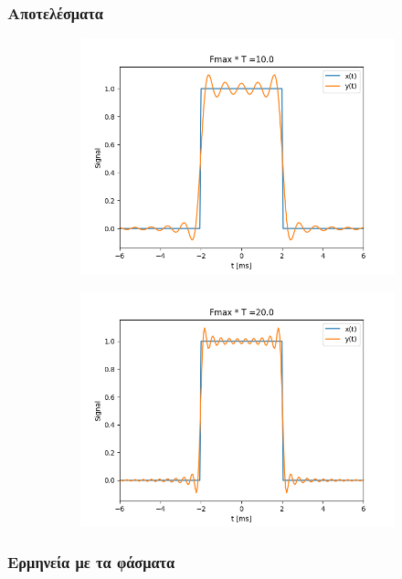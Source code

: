 \documentclass[9pt]{beamer}
\begin{document}
	\begin{frame}
	\frametitle{Αποτελέσματα}
	\begin{figure}
		\begin{subfigure}{0.49\linewidth}
			\includegraphics[width=\linewidth]{BT10}
		\end{subfigure}
		\begin{subfigure}{0.49\linewidth}
			\includegraphics[width=\linewidth]{BT20}	
		\end{subfigure}		
	\end{figure}
	\end{frame}

	\begin{frame}
	\frametitle{Ερμηνεία με τα φάσματα}
	
	\end{frame}
\end{document}
